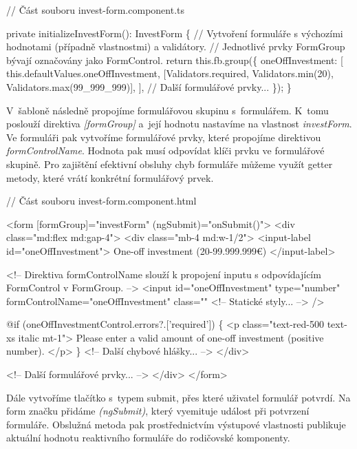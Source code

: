 \begin{prog}
// Část souboru invest-form.component.ts

private initializeInvestForm(): InvestForm \{
  // Vytvoření formuláře s výchozími hodnotami 
    (případně vlastnostmi) a validátory.
  // Jednotlivé prvky FormGroup bývají označovány jako FormControl.
  return this.fb.group(\{
    oneOffInvestment: [
      this.defaultValues.oneOffInvestment,
      [Validators.required, Validators.min(20), Validators.max(99_999_999)],
    ],
    // Další formulářové prvky... 
  \});
\}
\end{prog}

V~šabloně následně propojíme formulářovou skupinu s~formulářem. K~tomu poslouží direktiva \emph{[formGroup]} a~její hodnotu nastavíme na vlastnost \emph{investForm}. 
Ve formuláři pak vytvoříme formulářové prvky, které propojíme direktivou \emph{formControlName}. Hodnota pak musí odpovídat klíči prvku ve formulářové skupině. 
Pro zajištění efektivní obsluhy chyb formuláře můžeme využít getter metody, které vrátí konkrétní formulářový prvek.

\begin{prog}
// Část souboru invest-form.component.html

<form [formGroup]="investForm" (ngSubmit)="onSubmit()">
  <div class="md:flex md:gap-4">
    <div class="mb-4 md:w-1/2">
      <input-label id="oneOffInvestment">
        One-off investment (20-99.999.999€)
      </input-label>

      <!-- Direktiva formControlName slouží k propojení inputu 
        s odpovídajícím FormControl v FormGroup. -->
      <input
        id="oneOffInvestment"
        type="number"
        formControlName="oneOffInvestment"
        class="" <!-- Statické styly... -->
      />

      @if (oneOffInvestmentControl.errors?.['required']) \{
        <p class="text-red-500 text-xs italic mt-1">
          Please enter a valid amount of one-off investment (positive number).
        </p>
      \}
      <!-- Další chybové hlášky... -->
    </div>

    <!-- Další formulářové prvky... -->
  </div>
</form>
\end{prog}

Dále vytvoříme tlačítko s~typem submit, přes které uživatel formulář potvrdí. Na form značku přidáme \emph{(ngSubmit)}, který vyemituje událost při potvrzení formuláře. 
Obslužná metoda pak prostřednictvím výstupové vlastnosti publikuje aktuální hodnotu reaktivního formuláře do rodičovské komponenty.

